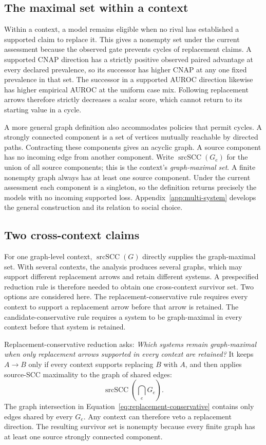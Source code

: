 \documentclass[11pt]{article}
\theoremstyle{remark}
\begin{document}
\subsection{The maximal set within a context}

Within a context, a model remains eligible when no rival has established a
supported claim to replace it. This gives a nonempty set under the current
assessment because the observed gate prevents cycles of replacement claims.
A supported CNAP direction has a strictly positive observed paired advantage
at every declared prevalence, so its successor has higher CNAP at any one
fixed prevalence in that set. The successor in a supported AUROC direction
likewise has higher empirical AUROC at the uniform case mix. Following
replacement arrows therefore strictly decreases a scalar score, which cannot
return to its starting value in a cycle.

A more general graph definition also accommodates policies that permit cycles.
A strongly connected component is a set of vertices mutually reachable by
directed paths. Contracting these components gives an acyclic graph. A source
component has no incoming edge from another component. Write
$\operatorname{srcSCC}(G_e)$ for the union of all source components; this is
the context's \emph{graph-maximal set}. A finite nonempty graph always has at
least one source component. Under the current assessment each component is a
singleton, so the definition returns precisely the models with no incoming
supported loss. Appendix~\ref{app:multi-system} develops the general
construction and its relation to social choice.

\subsection{Two cross-context claims}

For one graph-level context, $\operatorname{srcSCC}(G)$ directly supplies the
graph-maximal set. With several contexts, the analysis produces several
graphs, which may support different replacement arrows and retain different
systems. A prespecified reduction rule is therefore needed to obtain one
cross-context survivor set. Two options are considered here. The
replacement-conservative rule requires every context to support a replacement
arrow before that arrow is retained. The candidate-conservative rule requires
a system to be graph-maximal in every context before that system is retained.

Replacement-conservative reduction asks: \emph{Which systems remain
graph-maximal when only replacement arrows supported in every context are
retained?} It keeps $A\to B$ only if every context supports replacing $B$ with
$A$, and then applies source-SCC maximality to the graph of shared edges:
\begin{equation}
\operatorname{srcSCC}\!\left(\bigcap_e G_e\right).
\label{eq:replacement-conservative}
\end{equation}
The graph intersection in Equation~\eqref{eq:replacement-conservative}
contains only edges shared by every $G_e$. Any context can therefore veto a
replacement direction. The resulting survivor set is nonempty because every
finite graph has at least one source strongly connected component.
\end{document}

